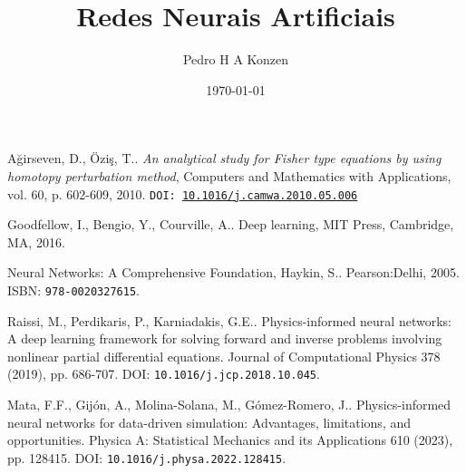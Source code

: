 \documentclass[12pt]{book}
\begin{document}
\frontmatter

\title{Redes Neurais Artificiais}
\author{Pedro H A Konzen}
\date{\today}
\ifishtml
\else
{}
\fi

\maketitle





\tableofcontents
{}

\mainmatter






\ifisbook

\fi

\ifisbook
\clearpage
{}
{}
\fi

\begin{thebibliography}{99}
  A\u{g}irseven, D., Özi\c{s}, T.. \textit{An analytical study for Fisher type equations by using homotopy   perturbation method}, Computers and Mathematics with Applications, vol. 60, p. 602-609, 2010. \texttt{DOI: \href{http://dx.doi.org/10.1016/j.camwa.2010.05.006}{10.1016/j.camwa.2010.05.006}}

  Goodfellow, I., Bengio, Y., Courville, A.. Deep learning, {MIT} Press, Cambridge, {MA}, 2016.

  Neural Networks: A Comprehensive Foundation, Haykin, S.. Pearson:Delhi, 2005. ISBN: \texttt{978-0020327615}.

  Raissi, M., Perdikaris, P., Karniadakis, G.E.. Physics-informed neural networks: A deep learning framework for solving forward and inverse problems involving nonlinear partial differential equations. Journal of Computational Physics 378 (2019), pp. 686-707. DOI: \texttt{10.1016/j.jcp.2018.10.045}.

  Mata, F.F., Gijón, A., Molina-Solana, M., Gómez-Romero, J.. Physics-informed neural networks for data-driven simulation: Advantages, limitations, and opportunities. Physica A: Statistical Mechanics and its Applications 610 (2023), pp. 128415. DOI: \texttt{10.1016/j.physa.2022.128415}.

\end{thebibliography}
\end{document}
